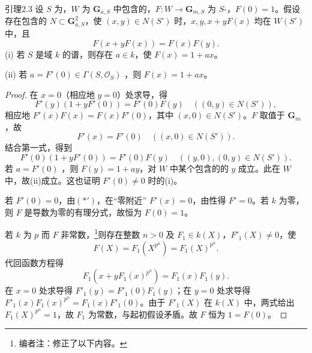 \begin{SGAresult}{引理}{2.3}
设 $S$ 为，$W$ 为 $\mathbf G_{a,S}$ 中包含的，$F:W\to\mathbf G_{m,S}$ 为 $S$-，$F(0)=1$。假设存在包含的 $N\subset\mathbf G_{a,S}^2$，使 $(x,y)\in N(S')$ 时，$x,y,x+yF(x)$ 均在 $W(S')$ 中，且
\[F(x+yF(x))=F(x)F(y).\tag{$\dagger$}\]
(i) 若 $S$ 是域 $k$ 的谱，则存在 $a\in k$，使 $F(x)=1+ax$。

(ii) 若 $a=F'(0)\in\Gamma(S,\mathscr O_S)$ ，则 $F(x)=1+ax$。
\end{SGAresult}
\begin{proof}
在 $x=0$（相应地 $y=0$）处求导，得
\[F'(y)(1+yF'(0))=F'(0)F(y)\quad((0,y)\in N(S')),\tag{*}\]
相应地 $F'(x)F(x)=F(x)F'(0)$，其中 $(x,0)\in N(S')$。$F$ 取值于 $\mathbf G_m$，故
\[F'(x)=F'(0)\quad((x,0)\in N(S')).\tag{$*'$}\]
结合第一式，得到
\[F'(0)(1+yF'(0))=F'(0)F(y)\quad((y,0),(0,y)\in N(S')).\]
若 $a=F'(0)$ ，则 $F(y)=1+ay$，对 $W$ 中某个包含的的 $y$ 成立。此在 $W$ 中，故(ii)成立。这也证明 $F'(0)\ne0$ 时的(i)。

若 $F'(0)=0$，由$(*')$，在“零附近” $F'(x)=0$，由性得 $F'=0$。若 $k$ 为零，则 $F$ 是导数为零的有理分式，故恒为 $F(0)=1$。

若 $k$ 为 $p$ 而 $F$ 非常数，\footnote{编者注：修正了以下内容。}则存在整数 $n>0$ 及 $F_1\in k(X)$，$F'_1(X)\ne0$，使
\[F(X)=F_1(X^{p^n})=F_1(X)^{p^n}.\]
代回函数方程得
\[F_1(x+yF_1(x)^{p^n})=F_1(x)F_1(y).\tag{$\dagger_1$}\]
在 $x=0$ 处求导得 $F'_1(y)=F'_1(0)F_1(y)$；在 $y=0$ 处求导得 $F'_1(x)F_1(x)^{p^n}=F_1(x)F'_1(0)$。由于 $F'_1(X)$ 在 $k(X)$ 中，两式给出 $F_1(X)^{p^n}=1$，故 $F_1$ 为常数，与起初假设矛盾。故 $F$ 恒为 $1=F(0)$。
\end{proof}
